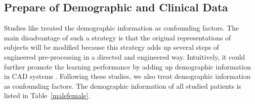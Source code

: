 \documentclass[journal]{IEEEtran}
\begin{document}
\subsection{Prepare of Demographic and Clinical Data}
\label{textdata}
Studies like \cite{dukart2011age, de2016machine} treated the demographic information as confounding factors. The main disadvantage of such a strategy is that the original representations of subjects will be modified because this strategy adds up several steps of engineered pre-processing in a directed and engineered way. Intuitively, it could further promote the learning performance by adding up demographic information in CAD systems \cite{liu2018joint}.
Following these studies, we also treat demographic information as confounding factors. The demographic information of all studied patients is listed in Table~\ref{malefemale}.
\end{document}
